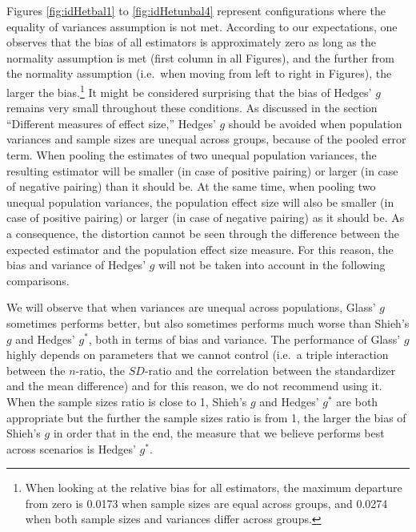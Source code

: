 \documentclass[
  english,
  man,floatsintext]{apa6}
\begin{document}
Figures \ref{fig:idHetbal1} to \ref{fig:idHetunbal4} represent configurations where the equality of variances assumption is not met. According to our expectations, one observes that the bias of all estimators is approximately zero as long as the normality assumption is met (first column in all Figures), and the further from the normality assumption (i.e.~when moving from left to right in Figures), the larger the bias.\footnote{When looking at the relative bias for all estimators, the maximum departure from zero is 0.0173 when sample sizes are equal across groups, and 0.0274 when both sample sizes and variances differ across groups.} It might be considered surprising that the bias of Hedges' \(g\) remains very small throughout these conditions. As discussed in the section ``Different measures of effect size,'' Hedges' \(g\) should be avoided when population variances and sample sizes are unequal across groups, because of the pooled error term. When pooling the estimates of two unequal population variances, the resulting estimator will be smaller (in case of positive pairing) or larger (in case of negative pairing) than it should be. At the same time, when pooling two unequal population variances, the population effect size will also be smaller (in case of positive pairing) or larger (in case of negative pairing) as it should be. As a consequence, the distortion cannot be seen through the difference between the expected estimator and the population effect size measure. For this reason, the bias and variance of Hedges' \(g\) will not be taken into account in the following comparisons.

We will observe that when variances are unequal across populations, Glass' \(g\) sometimes performs better, but also sometimes performs much worse than Shieh's \(g\) and Hedges' \(g^*\), both in terms of bias and variance. The performance of Glass' \(g\) highly depends on parameters that we cannot control (i.e.~a triple interaction between the \(n\)-ratio, the \(SD\)-ratio and the correlation between the standardizer and the mean difference) and for this reason, we do not recommend using it. When the sample sizes ratio is close to 1, Shieh's \(g\) and Hedges' \(g^*\) are both appropriate but the further the sample sizes ratio is from 1, the larger the bias of Shieh's \(g\) in order that in the end, the measure that we believe performs best across scenarios is Hedges' \(g^*\).
\end{document}

